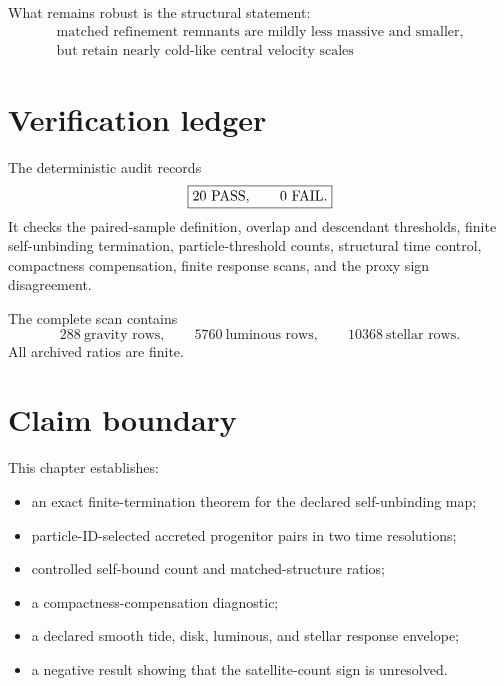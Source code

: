 What remains robust is the structural statement:
\begin{equation}
\boxed{
\begin{gathered}
\text{matched refinement remnants are mildly less massive and smaller,}\\
\text{but retain nearly cold-like central velocity scales}
\end{gathered}
}
\label{eq:sct-robust-claim}
\end{equation}

\section{Verification ledger}

The deterministic audit records
\begin{equation}
\boxed{
20\ {\rm PASS},
\qquad
0\ {\rm FAIL}.
}
\label{eq:sct-pass-count}
\end{equation}
It checks the paired-sample definition, overlap and descendant thresholds, finite self-unbinding termination, particle-threshold counts, structural time control, compactness compensation, finite response scans, and the proxy sign disagreement.

The complete scan contains
\begin{equation}
288\ \text{gravity rows},
\qquad
5760\ \text{luminous rows},
\qquad
10368\ \text{stellar rows}.
\label{eq:sct-scan-counts}
\end{equation}
All archived ratios are finite.

\section{Claim boundary}

This chapter establishes:
\begin{itemize}
\item an exact finite-termination theorem for the declared self-unbinding map;
\item particle-ID-selected accreted progenitor pairs in two time resolutions;
\item controlled self-bound count and matched-structure ratios;
\item a compactness-compensation diagnostic;
\item a declared smooth tide, disk, luminous, and stellar response envelope;
\item a negative result showing that the satellite-count sign is unresolved.
\end{itemize}

